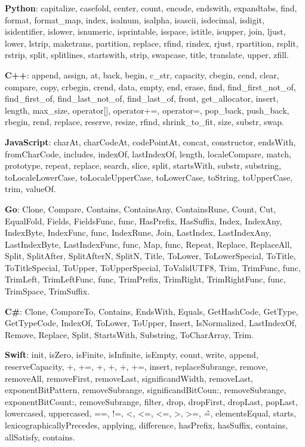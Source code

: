 \documentclass[anonymous,sigplan,review,11pt,nonacm,natbib=false]{acmart}
\begin{document}
    \textbf{Python}: capitalize, casefold, center, count, encode, endswith, expandtabs, find, format, format\_map, index, isalnum, isalpha, isascii, isdecimal, isdigit, isidentifier, islower, isnumeric, isprintable, isspace, istitle, isupper, join, ljust, lower, lstrip, maketrans, partition, replace, rfind, rindex, rjust, rpartition, rsplit, rstrip, split, splitlines, startswith, strip, swapcase, title, translate, upper, zfill.

    \textbf{C++}: append, assign, at, back, begin, c\_str, capacity, cbegin, cend, clear, compare, copy, crbegin, crend, data, empty, end, erase, find, find\_first\_not\_of, find\_first\_of, find\_last\_not\_of, find\_last\_of, front, get\_allocator, insert, length, max\_size, operator[], operator+=, operator=, pop\_back, push\_back, rbegin, rend, replace, reserve, resize, rfind, shrink\_to\_fit, size, substr, swap.

    \textbf{JavaScript}: charAt, charCodeAt, codePointAt, concat, constructor, endsWith, fromCharCode, includes, indexOf, lastIndexOf, length, localeCompare, match, prototype, repeat, replace, search, slice, split, startsWith, substr, substring, toLocaleLowerCase, toLocaleUpperCase, toLowerCase, toString, toUpperCase, trim, valueOf.

    \textbf{Go}: Clone, Compare, Contains, ContainsAny, ContainsRune, Count, Cut, EqualFold, Fields, FieldsFunc, func, HasPrefix, HasSuffix, Index, IndexAny, IndexByte, IndexFunc, func, IndexRune, Join, LastIndex, LastIndexAny, LastIndexByte, LastIndexFunc, func, Map, func, Repeat, Replace, ReplaceAll, Split, SplitAfter, SplitAfterN, SplitN, Title, ToLower, ToLowerSpecial, ToTitle, ToTitleSpecial, ToUpper, ToUpperSpecial, ToValidUTF8, Trim, TrimFunc, func, TrimLeft, TrimLeftFunc, func, TrimPrefix, TrimRight, TrimRightFunc, func, TrimSpace, TrimSuffix.

    \textbf{C\#}: Clone, CompareTo, Contains, EndsWith, Equals, GetHashCode, GetType, GetTypeCode, IndexOf, ToLower, ToUpper, Insert, IsNormalized, LastIndexOf, Remove, Replace, Split, StartsWith, Substring, ToCharArray, Trim.

    \textbf{Swift}: init, isZero, isFinite, isInfinite, isEmpty, count, write, append, reserveCapacity, +, +=, +, +, +, +=, insert, replaceSubrange, remove, removeAll, removeFirst, removeLast, significandWidth, removeLast, exponentBitPattern, removeSubrange, significandBitCoun:, removeSubrange, exponentBitCount:, removeSubrange, filter, drop, dropFirst, dropLast, popLast, lowercased, uppercased, ==, !=, <, <=, <=, >, >=, \~=, elementsEqual, starts, lexicographicallyPrecedes, applying, difference, hasPrefix, hasSuffix, contains, allSatisfy, contains.
\end{document}
